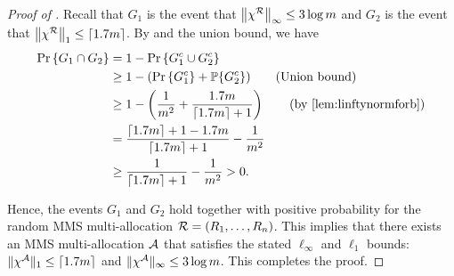 \begin{proof}[Proof of ] Recall that $G_1$ is the event that $\left\|\chi^{\mathcal{R}}\right\|_\infty \leq 3 \log m$ and $G_2$ is the event that $\left\|\chi^{\mathcal{R}}\right\|_1 \leq \lceil 1.7m \rceil$. By  and the union bound, we have \begin{align*} \displaystyle \prob{G_1 \cap G_2} 
& = 1 - \prob{G_1^c \cup G_2^c} \\ 
& \geq 1 - (\prob{G_1^c} +\mathbb{P}\{G_2^c\}) \tag{Union bound} \\ 
& \geq 1-\left(\frac{1}{m^{2}} + \frac{1.7m}{\lceil1.7m\rceil+1} \right) \tag{by \Cref{lem:linftynormforb}} \\
& = \frac{\lceil 1.7m\rceil + 1 - 1.7m}{\lceil1.7m\rceil+1} - \frac{1}{m^{2}} \\
& \geq \frac{1}{\lceil1.7m\rceil+1} - \frac{1}{m^{2}} > 0.
\end{align*}

Hence, the events $G_1$ and $G_2$ hold together with positive probability for the random MMS multi-allocation $\mathcal{R} = (R_1,\dots,R_n)$. This implies that there exists an MMS multi-allocation $\mathcal{A}$ that satisfies the stated $\ell_\infty$ and $\ell_1$ bounds: $\|\chi^{\mathcal{A}}\|_1\leq \lceil 1.7m \rceil $ and $\|\chi^{\mathcal{A}}\|_\infty \leq 3 \log m$. This completes the proof. 
\end{proof}